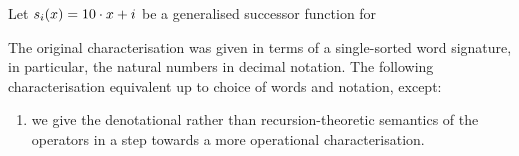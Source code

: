 \begin{definition}\cite{cobham-1965}

Let $s_i{\mathopen{}\left({x}\right)\mathclose{}} = 10 \cdot x + i$ be a generalised successor function for

\end{definition}

The original characterisation was given in terms of a single-sorted word
signature, in particular, the natural numbers in decimal notation. The
following characterisation equivalent up to choice of words and notation,
except:

\begin{enumerate}[label=(\arabic*)]

\item we give the denotational rather than recursion-theoretic semantics of the
operators in a step towards a more operational characterisation.

\end{enumerate}

\def\smashf{\ensuremath{\mathtt{\#}}}
\def\cdotnot{\ensuremath{\cdot}}

